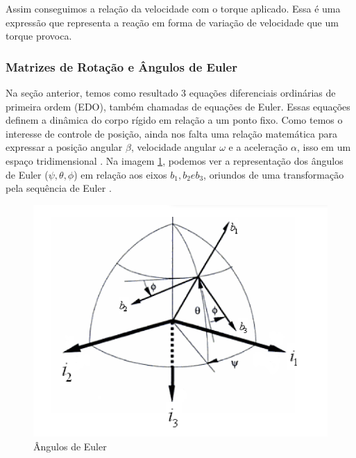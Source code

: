 Assim conseguimos a relação da velocidade com o torque aplicado. Essa é uma expressão que representa a reação em forma de variação de velocidade que um torque provoca.



\subsubsection{Matrizes de Rotação e Ângulos de Euler}

Na seção anterior, temos como resultado 3 equações diferenciais ordinárias de primeira ordem (EDO), também chamadas de equações de Euler. Essas equações definem a dinâmica do corpo rígido em relação a um ponto fixo. Como temos o interesse de controle de posição, ainda nos falta uma relação matemática para expressar a posição angular $\beta$, velocidade angular $\omega$ e a aceleração $\alpha$, isso em um espaço tridimensional \cite{Snider}. Na imagem \ref{fig:coordenada}, podemos ver a representação dos ângulos de Euler ($\psi, \theta, \phi$) em relação aos eixos $b_1, b_2 e b_3$, oriundos de uma transformação pela sequência de Euler \cite{BongWie2001}.

\begin{figure}[H]
  \caption{Ângulos de Euler}
  \begin{center}
      \includegraphics[scale=0.5]{img/euler_snider_p28}
  \end{center}
  \label{fig:coordenada}
\end{figure}

